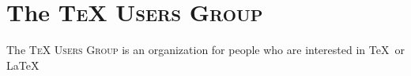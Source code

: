 \documentclass{article}
\newcommand{\TUG}{\textsc{TeX Users Group}\xspace}
\begin{document}
    \section{The \TUG}
    The \TUG is an organization for people who are interested in \TeX\ or \LaTeX\.
\end{document}
